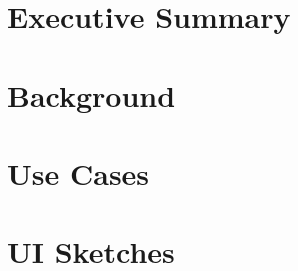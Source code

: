 





\newpage

\tableofcontents

\newpage

\section{Executive Summary}



\section{Background}



\appendix

\section{Use Cases}



\section{UI Sketches}




